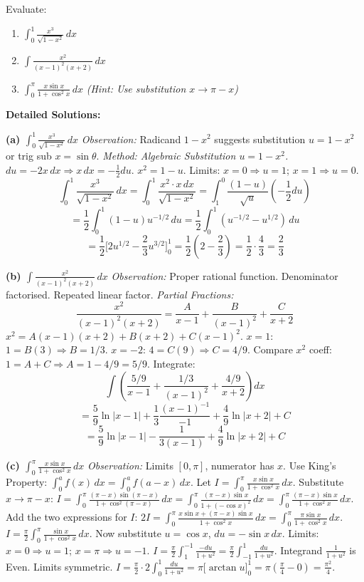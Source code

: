 \documentclass[11pt]{article}
\begin{document}
\begin{exoresolu}
Evaluate:
\begin{enumerate}
    \item $\displaystyle \int_0^1 \frac{x^3}{\sqrt{1-x^2}}\,dx$
    \item $\displaystyle \int \frac{x^2}{(x-1)^2(x+2)}\,dx$
    \item $\displaystyle \int_0^{\pi} \frac{x \sin x}{1+\cos^2 x}\,dx$ \emph{(Hint: Use substitution $x \to \pi - x$)}
\end{enumerate}
\tcblower
\textbf{Detailed Solutions:}

\textbf{(a) $\int_0^1 \frac{x^3}{\sqrt{1-x^2}}\,dx$}
\emph{Observation:} Radicand $1-x^2$ suggests substitution $u=1-x^2$ or trig sub $x=\sin\theta$.
\emph{Method: Algebraic Substitution $u = 1-x^2$.}
$du = -2x\,dx \Rightarrow x\,dx = -\frac{1}{2}du$.
$x^2 = 1-u$. Limits: $x=0 \Rightarrow u=1$; $x=1 \Rightarrow u=0$.
\[
\int_0^1 \frac{x^3}{\sqrt{1-x^2}}\,dx = \int_0^1 \frac{x^2 \cdot x\,dx}{\sqrt{1-x^2}} = \int_1^0 \frac{(1-u)}{\sqrt{u}} \left(-\frac{1}{2}du\right)
\]
\[
= \frac{1}{2}\int_0^1 (1-u)u^{-1/2}\,du = \frac{1}{2}\int_0^1 (u^{-1/2} - u^{1/2})\,du
\]
\[
= \frac{1}{2}\Big[ 2u^{1/2} - \frac{2}{3}u^{3/2} \Big]_0^1 = \frac{1}{2}\left( 2 - \frac{2}{3} \right) = \frac{1}{2}\cdot\frac{4}{3} = \boxed{\frac{2}{3}}
\]

\textbf{(b) $\int \frac{x^2}{(x-1)^2(x+2)}\,dx$}
\emph{Observation:} Proper rational function. Denominator factorised. Repeated linear factor.
\emph{Partial Fractions:}
\[
\frac{x^2}{(x-1)^2(x+2)} = \frac{A}{x-1} + \frac{B}{(x-1)^2} + \frac{C}{x+2}
\]
$x^2 = A(x-1)(x+2) + B(x+2) + C(x-1)^2$.
$x=1$: $1 = B(3) \Rightarrow B = 1/3$.
$x=-2$: $4 = C(9) \Rightarrow C = 4/9$.
Compare $x^2$ coeff: $1 = A + C \Rightarrow A = 1 - 4/9 = 5/9$.
Integrate:
\[
\int \left( \frac{5/9}{x-1} + \frac{1/3}{(x-1)^2} + \frac{4/9}{x+2} \right) dx
\]
\[
= \frac{5}{9}\ln|x-1| + \frac{1}{3}\frac{(x-1)^{-1}}{-1} + \frac{4}{9}\ln|x+2| + C
\]
\[
= \boxed{\frac{5}{9}\ln|x-1| - \frac{1}{3(x-1)} + \frac{4}{9}\ln|x+2| + C}
\]

\textbf{(c) $\int_0^{\pi} \frac{x \sin x}{1+\cos^2 x}\,dx$}
\emph{Observation:} Limits $[0, \pi]$, numerator has $x$. Use King's Property: $\int_0^a f(x)\,dx = \int_0^a f(a-x)\,dx$.
Let $I = \int_0^{\pi} \frac{x \sin x}{1+\cos^2 x}\,dx$.
Substitute $x \to \pi - x$:
$I = \int_0^{\pi} \frac{(\pi - x) \sin(\pi - x)}{1+\cos^2(\pi - x)}\,dx = \int_0^{\pi} \frac{(\pi - x) \sin x}{1+(-\cos x)^2}\,dx = \int_0^{\pi} \frac{(\pi - x) \sin x}{1+\cos^2 x}\,dx$.
Add the two expressions for $I$:
$2I = \int_0^{\pi} \frac{x\sin x + (\pi-x)\sin x}{1+\cos^2 x}\,dx = \int_0^{\pi} \frac{\pi \sin x}{1+\cos^2 x}\,dx$.
$I = \frac{\pi}{2} \int_0^{\pi} \frac{\sin x}{1+\cos^2 x}\,dx$.
Now substitute $u = \cos x$, $du = -\sin x\,dx$.
Limits: $x=0 \Rightarrow u=1$; $x=\pi \Rightarrow u=-1$.
$I = \frac{\pi}{2} \int_1^{-1} \frac{-du}{1+u^2} = \frac{\pi}{2} \int_{-1}^{1} \frac{du}{1+u^2}$.
Integrand $\frac{1}{1+u^2}$ is Even. Limits symmetric.
$I = \frac{\pi}{2} \cdot 2 \int_0^1 \frac{du}{1+u^2} = \pi \Big[\arctan u\Big]_0^1 = \pi \left( \frac{\pi}{4} - 0 \right) = \boxed{\frac{\pi^2}{4}}$.
\end{exoresolu}
\end{document}
